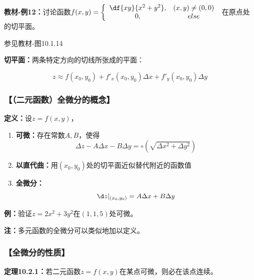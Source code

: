 {\bf 教材-例12：}讨论函数$f(x,y)=\left\{\begin{array}{cc}
	\df{xy}{x^2+y^2},& (x,y)\ne (0,0)\\
	0, & else
\end{array}\right.$
在原点处的切平面。

\begin{center}
	
	参见教材-图10.1.14
\end{center}

{\bf 切平面：}两条特定方向的切线所张成的平面：

$$z\approx f(x_0,y_0)+f'_x(x_0,y_0)\Delta x+f'_y(x_0,y_0)\Delta y$$

\subsubsection{【（二元函数）全微分的概念】}

{\bf 定义：}设$z=f(x,y)$，
\begin{enumerate}[(1)]
  \setlength{\itemindent}{1cm}
  \item {\bf 可微：}存在常数$A,B$，使得
  $${\Delta z-A\Delta x-B\Delta y=\circ(\sqrt{\Delta x^2+\Delta y^2})}$$
  \item {\bf 以直代曲：}用$(x_0,y_0)$处的切平面近似替代附近的函数值
  \item {\bf 全微分：}$${\d z|_{(x_0,y_0)}=A\Delta x+B\Delta y}$$
\end{enumerate}

{\bf 例：}验证$z=2x^2+3y^2$在$(1,1,5)$处可微。

{\bf 注：}多元函数的全微分可以类似地加以定义。

\subsubsection{【全微分的性质】}

{\bf 定理10.2.1：}若二元函数$z=f(x,y)$在某点可微，则必在该点连续。


